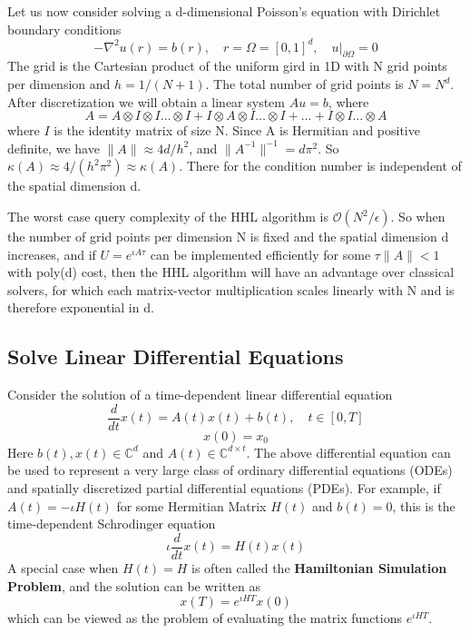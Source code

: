 \documentclass[12pt, oneside]{book}
\theoremstyle{definition}
\theoremstyle{definition}
\theoremstyle{remark}
\begin{document}
Let us now consider solving a d-dimensional Poisson's equation with Dirichlet boundary conditions
\[
-\nabla^2u(r)=b(r), \quad r=\Omega=[0,1]^d, \quad u|_{\partial \Omega}=0
\]
The grid is the Cartesian product of the uniform gird in 1D with N grid points per dimension and $h=1/(N+1)$. The total number of grid points is $N=N^d$. After discretization we will obtain a linear system $Au=b$, where
\[
A=A\otimes I \otimes I \ldots \otimes I + I \otimes A \otimes I \ldots \otimes I + \ldots + I \otimes I \ldots \otimes A
\]
where $I$ is the identity matrix of size N. Since A is Hermitian and positive definite, we have $\|A\|\approx 4d/h^2$, and $\|A^{-1}\|^{-1}=d\pi^2$. So $\kappa(A)\approx 4/(h^2\pi^2) \approx \kappa(A)$. There for the condition number is independent of the spatial dimension d.

The worst case query complexity of the HHL algorithm is $\mathcal{O}(N^2/\epsilon)$. So when the number of grid points per dimension N is fixed and the spatial dimension d increases, and if $U=e^{\iota A\tau}$ can be implemented efficiently for some $\tau \|A\|<1$ with poly(d) cost, then the HHL algorithm will have an advantage over classical solvers, for which each matrix-vector multiplication scales linearly with N and is therefore exponential in d.

\subsection{Solve Linear Differential Equations}
Consider the solution of a time-dependent linear differential equation
\[
\frac{d}{dt}x(t)=A(t)x(t)+b(t), \quad t \in [0,T]
\]
\[
x(0)=x_0
\]
Here $b(t),x(t) \in \mathbb{C}^d$ and $A(t) \in \mathbb{C}^{d \times t}$.
The above differential equation can be used to represent a very large class of ordinary differential equations (ODEs) and spatially discretized partial differential equations (PDEs). For example, if $A(t)=-\iota H(t)$ for some Hermitian Matrix $H(t)$ and $b(t)=0$, this is the time-dependent Schrodinger equation
\[
\iota \frac{d}{dt}x(t)=H(t)x(t)
\]
A special case when $H(t)=H$ is often called the \textbf{Hamiltonian Simulation Problem}, and the solution can be written as
\[
x(T)=e^{\iota HT}x(0)
\]
which can be viewed as the problem of evaluating the matrix functions $e^{\iota HT}$.
\end{document}
